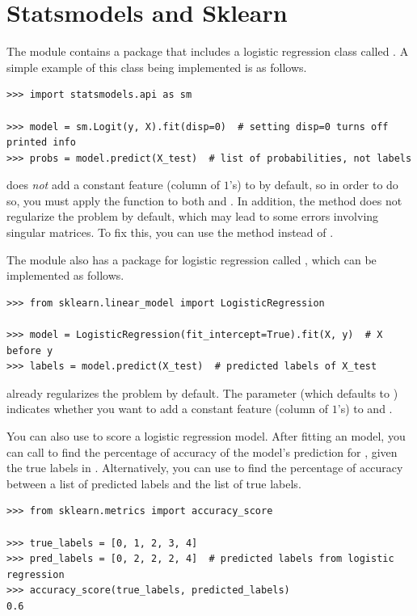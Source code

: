 \section*{Statsmodels and Sklearn}

The module  contains a package that includes a logistic regression class called .
A simple example of this class being implemented is as follows.
\begin{lstlisting}
>>> import statsmodels.api as sm

>>> model = sm.Logit(y, X).fit(disp=0)  # setting disp=0 turns off printed info
>>> probs = model.predict(X_test)  # list of probabilities, not labels
\end{lstlisting}
 does \emph{not} add a constant feature (column of $1$'s) to  by default, so in order to do so, you must apply the function  to both  and .
In addition, the  method does not regularize the problem by default, which may lead to some errors involving singular matrices.
To fix this, you can use the  method instead of .

The module  also has a package for logistic regression called , which can be implemented as follows.

\begin{lstlisting}
>>> from sklearn.linear_model import LogisticRegression

>>> model = LogisticRegression(fit_intercept=True).fit(X, y)  # X before y
>>> labels = model.predict(X_test)  # predicted labels of X_test
\end{lstlisting}
 already regularizes the problem by default.
The parameter  (which defaults to ) indicates whether you want to add a constant feature (column of $1$'s) to  and .

You can also use  to score a logistic regression model.
After fitting an  model, you can call  to find the percentage of accuracy of the model's prediction for , given the true labels in .
Alternatively, you can use  to find the percentage of accuracy between a list of predicted labels and the list of true labels.
\begin{lstlisting}
>>> from sklearn.metrics import accuracy_score

>>> true_labels = [0, 1, 2, 3, 4]
>>> pred_labels = [0, 2, 2, 2, 4]  # predicted labels from logistic regression
>>> accuracy_score(true_labels, predicted_labels)
0.6
\end{lstlisting}

